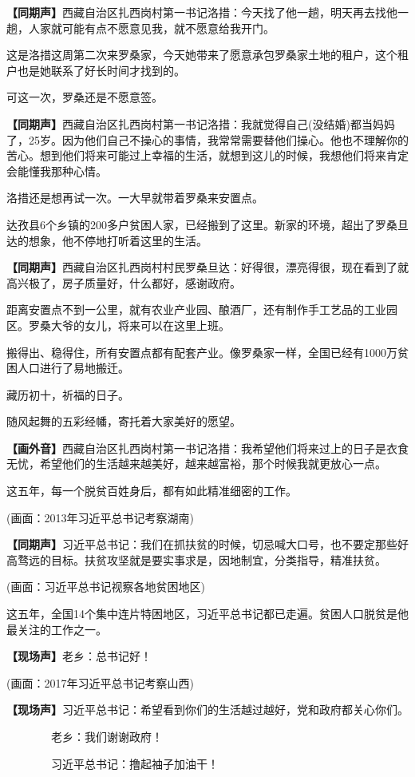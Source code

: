 \documentclass{ctexart}
\newcommand{\zkh}[1]{\textbf{\hspace{-2.7em} 【#1】}}
\begin{document}
\zkh{同期声}西藏自治区扎西岗村第一书记洛措：今天找了他一趟，明天再去找他一趟，人家就可能有点不愿意见我，就不愿意给我开门。

这是洛措这周第二次来罗桑家，今天她带来了愿意承包罗桑家土地的租户，这个租户也是她联系了好长时间才找到的。

可这一次，罗桑还是不愿意签。

\zkh{同期声}西藏自治区扎西岗村第一书记洛措：我就觉得自己(没结婚)都当妈妈了，25岁。因为他们自己不操心的事情，我常常需要替他们操心。他也不理解你的苦心。想到他们将来可能过上幸福的生活，就想到这儿的时候，我想他们将来肯定会能懂我那种心情。

洛措还是想再试一次。一大早就带着罗桑来安置点。

达孜县6个乡镇的200多户贫困人家，已经搬到了这里。新家的环境，超出了罗桑旦达的想象，他不停地打听着这里的生活。

\zkh{同期声}西藏自治区扎西岗村村民罗桑旦达：好得很，漂亮得很，现在看到了就高兴极了，房子质量好，什么都好，感谢政府。

距离安置点不到一公里，就有农业产业园、酿酒厂，还有制作手工艺品的工业园区。罗桑大爷的女儿，将来可以在这里上班。

搬得出、稳得住，所有安置点都有配套产业。像罗桑家一样，全国已经有1000万贫困人口进行了易地搬迁。

藏历初十，祈福的日子。

随风起舞的五彩经幡，寄托着大家美好的愿望。

\zkh{画外音}西藏自治区扎西岗村第一书记洛措：我希望他们将来过上的日子是衣食无忧，希望他们的生活越来越美好，越来越富裕，那个时候我就更放心一点。

这五年，每一个脱贫百姓身后，都有如此精准细密的工作。

(画面：2013年习近平总书记考察湖南)

\zkh{同期声}习近平总书记：我们在抓扶贫的时候，切忌喊大口号，也不要定那些好高骛远的目标。扶贫攻坚就是要实事求是，因地制宜，分类指导，精准扶贫。

(画面：习近平总书记视察各地贫困地区)

这五年，全国14个集中连片特困地区，习近平总书记都已走遍。贫困人口脱贫是他最关注的工作之一。

\zkh{现场声}老乡：总书记好！

(画面：2017年习近平总书记考察山西)

\zkh{现场声}习近平总书记：希望看到你们的生活越过越好，党和政府都关心你们。

　　　　老乡：我们谢谢政府！

　　　　习近平总书记：撸起袖子加油干！
\end{document}
